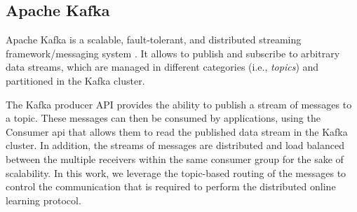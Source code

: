 \subsection{Apache Kafka}

\par Apache Kafka is a scalable, fault-tolerant, and distributed streaming framework/messaging system \cite{Kafka}. It allows to publish and subscribe to arbitrary data streams, which are managed in different categories (i.e., \textit{topics}) and  partitioned in the Kafka cluster. 
\par The Kafka producer API provides the ability to publish a stream of messages to a topic. These messages can then be consumed by applications, using the Consumer \ac{api} that allows them to read the published data stream in the Kafka cluster. In addition, the streams of messages are distributed and load balanced between the multiple receivers within the same consumer group for the sake of scalability. In this work, we leverage the topic-based routing of the messages to control the communication that is required to perform the distributed online learning protocol. 
  





%
